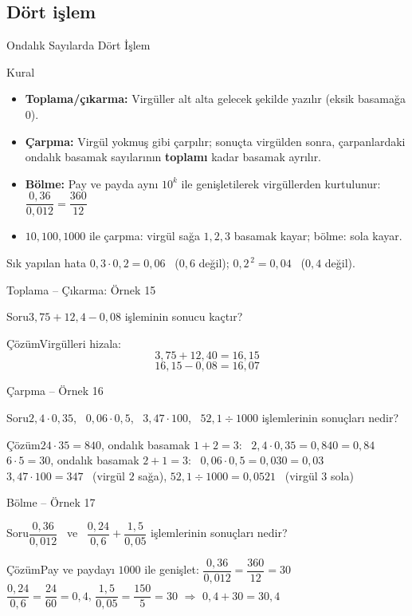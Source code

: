 \documentclass[aspectratio=169,11pt]{beamer}
\newcommand{\soru}[3]{%
\begin{frame}{#1}
  \begin{block}{Soru}\large #2\end{block}
  \pause
  \begin{exampleblock}{Çözüm}\large #3\end{exampleblock}
\end{frame}}
\begin{document}
\subsection{Dört işlem}
\begin{frame}{Ondalık Sayılarda Dört İşlem}
\begin{block}{Kural}
\begin{itemize}
\item \textbf{Toplama/çıkarma:} Virgüller alt alta gelecek şekilde yazılır (eksik basamağa \(0\)).
\item \textbf{Çarpma:} Virgül yokmuş gibi çarpılır; sonuçta virgülden sonra, çarpanlardaki ondalık basamak sayılarının \textbf{toplamı} kadar basamak ayrılır.
\item \textbf{Bölme:} Pay ve payda aynı \(10^k\) ile genişletilerek virgüllerden kurtulunur:\ \(\dfrac{0{,}36}{0{,}012}=\dfrac{360}{12}\)
\item \(10,100,1000\) ile çarpma: virgül sağa \(1,2,3\) basamak kayar; bölme: sola kayar.
\end{itemize}
\end{block}
\begin{alertblock}{Sık yapılan hata}
\(0{,}3\cdot 0{,}2=0{,}06\) \ (\(0{,}6\) değil); \quad \(0{,}2^{\,2}=0{,}04\) \ (\(0{,}4\) değil).
\end{alertblock}
\end{frame}

\soru{Toplama -- Çıkarma: Örnek 15}
{\(3{,}75+12{,}4-0{,}08\) işleminin sonucu kaçtır?}
{Virgülleri hizala:
\[3{,}75+12{,}40=16{,}15\]
\[16{,}15-0{,}08=16{,}07\]}

\soru{Çarpma -- Örnek 16}
{\(2{,}4\cdot 0{,}35\), \ \(0{,}06\cdot 0{,}5\), \ \(3{,}47\cdot 100\), \ \(52{,}1\div 1000\) işlemlerinin sonuçları nedir?}
{\(24\cdot 35=840\), ondalık basamak \(1+2=3\): \ \(2{,}4\cdot 0{,}35=0{,}840=0{,}84\)\\[3pt]
\(6\cdot 5=30\), ondalık basamak \(2+1=3\): \ \(0{,}06\cdot 0{,}5=0{,}030=0{,}03\)\\[3pt]
\(3{,}47\cdot 100=347\) \ (virgül \(2\) sağa), \quad \(52{,}1\div 1000=0{,}0521\) \ (virgül \(3\) sola)}

\soru{Bölme -- Örnek 17}
{\(\dfrac{0{,}36}{0{,}012}\) \ ve \ \(\dfrac{0{,}24}{0{,}6}+\dfrac{1{,}5}{0{,}05}\) işlemlerinin sonuçları nedir?}
{Pay ve paydayı \(1000\) ile genişlet: \quad \(\dfrac{0{,}36}{0{,}012}=\dfrac{360}{12}=30\)\\[4pt]
\(\dfrac{0{,}24}{0{,}6}=\dfrac{24}{60}=0{,}4\), \quad \(\dfrac{1{,}5}{0{,}05}=\dfrac{150}{5}=30\) \quad \(\Rightarrow\) \quad \(0{,}4+30=30{,}4\)}
\end{document}
